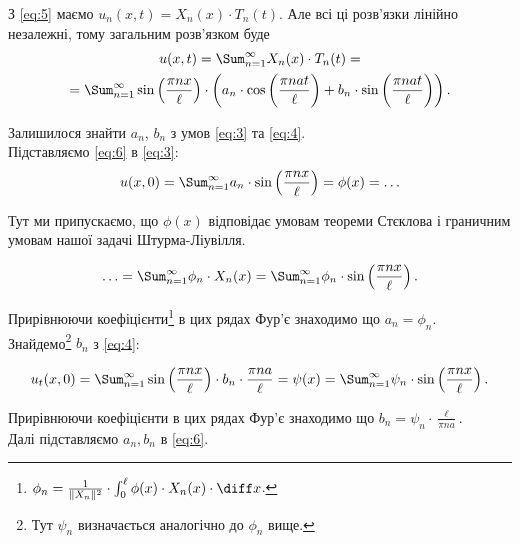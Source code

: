 \begin{solution}
	З \eqref{eq:5} маємо $u_n(x, t) = X_n(x) \cdot T_n(t)$. Але всі ці розв'язки лінійно незалежні, тому загальним розв'язком буде
	\begin{multline}
		\label{eq:6}
		u(x, t) = \Sum_{n = 1}^\infty X_n(x) \cdot T_n(t) = \\ = \Sum_{n = 1}^\infty \sin \left( \frac{\pi n x}{\ell} \right) \cdot \left( a_n \cdot \cos \left( \frac{\pi n a t}{\ell} \right) + b_n \cdot \sin \left( \frac{\pi n a t}{\ell} \right) \right).
	\end{multline}

	Залишилося знайти $a_n$, $b_n$ з умов \eqref{eq:3} та \eqref{eq:4}. \\

	Підставляємо \eqref{eq:6} в \eqref{eq:3}:
	\begin{equation*}
		u(x, 0) = \Sum_{n = 1}^\infty a_n \cdot \sin \left( \frac{\pi n x}{\ell} \right) = \phi(x) = \ldots
	\end{equation*}

	\begin{remark*}
		Тут ми припускаємо, що $\phi(x)$ відповідає умовам теореми Стєклова і граничним умовам нашої задачі Штурма-Ліувілля.
	\end{remark*}

	\begin{equation*}
		\ldots = \Sum_{n = 1}^\infty \phi_n \cdot X_n(x) = \Sum_{n = 1}^\infty \phi_n \cdot \sin \left( \frac{\pi n x}{\ell} \right).
	\end{equation*}

	Прирівнюючи коефіцієнти\footnote{$\phi_n = \frac{1}{\|X_n\|^2} \cdot \int_0^\ell \phi(x) \cdot X_n(x) \cdot \diff x$.} в цих рядах Фур'є знаходимо що $a_n = \phi_n$.\\

	Знайдемо\footnote{Тут $\psi_n$ визначається аналогічно до $\phi_n$ вище.} $b_n$ з \eqref{eq:4}:

	\begin{equation*}
		u_t(x, 0) = \Sum_{n = 1}^\infty \sin \left( \frac{\pi n x}{\ell} \right) \cdot b_n \cdot \frac{\pi n a}{\ell} = \psi(x) = \Sum_{n = 1}^\infty \psi_n \cdot \sin \left( \frac{\pi n x}{\ell} \right).
	\end{equation*}

	Прирівнюючи коефіцієнти в цих рядах Фур'є знаходимо що $b_n = \psi_n \cdot \frac{\ell}{\pi n a}$.\\	

	Далі підставляємо $a_n, b_n$ в \eqref{eq:6}.
\end{solution}

